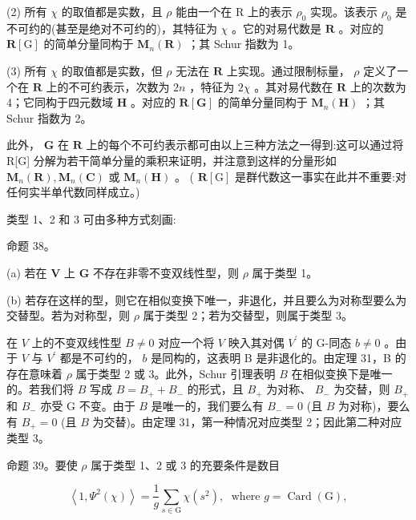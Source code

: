 \documentclass[10pt]{article}
\begin{document}
(2) 所有 \(\chi\) 的取值都是实数，且 \(\rho\) 能由一个在 R 上的表示 \({\rho }_{0}\) 实现。该表示 \({\rho }_{0}\) 是不可约的(甚至是绝对不可约的)，其特征为 \(\chi\) 。它的对易代数是 \(\mathbf{R}\) 。对应的 \(\mathbf{R}\left\lbrack  \mathrm{G}\right\rbrack\) 的简单分量同构于 \({\mathbf{M}}_{n}\left( \mathbf{R}\right)\) ；其 Schur 指数为 1。

(3) 所有 \(\chi\) 的取值都是实数，但 \(\rho\) 无法在 \(\mathbf{R}\) 上实现。通过限制标量， \(\rho\) 定义了一个在 \(\mathbf{R}\) 上的不可约表示，次数为 \({2n}\) ，特征为 \({2\chi }\) 。其对易代数在 \(\mathbf{R}\) 上的次数为 4；它同构于四元数域 \(\mathbf{H}\) 。对应的 \(\mathbf{R}\left\lbrack  \mathbf{G}\right\rbrack\) 的简单分量同构于 \({\mathbf{M}}_{n}\left( \mathbf{H}\right)\) ；其 Schur 指数为 2。

此外， \(\mathbf{G}\) 在 \(\mathbf{R}\) 上的每个不可约表示都可由以上三种方法之一得到:这可以通过将 R[G] 分解为若干简单分量的乘积来证明，并注意到这样的分量形如 \({\mathbf{M}}_{n}\left( \mathbf{R}\right) ,{\mathbf{M}}_{n}\left( \mathbf{C}\right)\) 或 \({\mathbf{M}}_{n}\left( \mathbf{H}\right)\) 。 ( \(\mathbf{R}\left\lbrack  \mathrm{G}\right\rbrack\) 是群代数这一事实在此并不重要:对任何实半单代数同样成立。)

类型 1、2 和 3 可由多种方式刻画:

命题 38。

(a) 若在 \(\mathbf{V}\) 上 \(\mathbf{G}\) 不存在非零不变双线性型，则 \(\rho\) 属于类型 1。

(b) 若存在这样的型，则它在相似变换下唯一，非退化，并且要么为对称型要么为交替型。若为对称型，则 \(\rho\) 属于类型 2；若为交替型，则属于类型 3。

在 \(V\) 上的不变双线性型 \(B \neq  0\) 对应一个将 \(V\) 映入其对偶 \({V}^{\prime }\) 的 G-同态 \(b \neq  0\) 。由于 \(V\) 与 \({V}^{\prime }\) 都是不可约的， \(b\) 是同构的，这表明 B 是非退化的。由定理 31，B 的存在意味着 \(\rho\) 属于类型 2 或 3。此外，Schur 引理表明 \(B\) 在相似变换下是唯一的。若我们将 \(B\) 写成 \(B = {B}_{ + } + {B}_{ - }\) 的形式，且 \({B}_{ + }\) 为对称、 \({B}_{ - }\) 为交替，则 \({B}_{ + }\) 和 \({B}_{ - }\) 亦受 G 不变。由于 \(B\) 是唯一的，我们要么有 \({B}_{ - } = 0\) (且 \(B\) 为对称)，要么有 \({B}_{ + } = 0\) (且 \(B\) 为交替)。由定理 31，第一种情况对应类型 2；因此第二种对应类型 3。

命题 39。要使 \(\rho\) 属于类型 1、2 或 3 的充要条件是数目

\[
\left\langle  {1,{\Psi }^{2}\left( \chi \right) }\right\rangle   = \frac{1}{g}\mathop{\sum }\limits_{{s \in  \mathrm{G}}}\chi \left( {s}^{2}\right) ,\;\text{ where }g = \operatorname{Card}\left( \mathrm{G}\right) ,
\]
\end{document}
